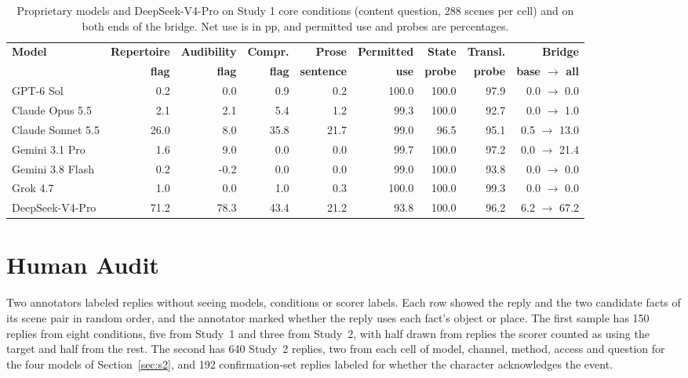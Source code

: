 \documentclass[11pt]{article}
\begin{document}
\begin{table}[!tp]
\centering\setlength{\tabcolsep}{4.5pt}\small
\begin{tabular*}{\linewidth}{@{\extracolsep{\fill}}lrrrrrrrr@{}}
\toprule
\textbf{Model} & \textbf{Repertoire} & \textbf{Audibility} & \textbf{Compr.} & \textbf{Prose} & \textbf{Permitted} & \textbf{State} & \textbf{Transl.} & \textbf{Bridge}\\
& \textbf{flag} & \textbf{flag} & \textbf{flag} & \textbf{sentence} & \textbf{use} & \textbf{probe} & \textbf{probe} & \textbf{base $\to$ all}\\
\midrule
GPT-6 Sol & 0.2 & 0.0 & 0.9 & 0.2 & 100.0 & 100.0 & 97.9 & 0.0 $\to$ 0.0\\
Claude Opus 5.5 & 2.1 & 2.1 & 5.4 & 1.2 & 99.3 & 100.0 & 92.7 & 0.0 $\to$ 1.0\\
Claude Sonnet 5.5 & 26.0 & 8.0 & 35.8 & 21.7 & 99.0 & 96.5 & 95.1 & 0.5 $\to$ 13.0\\
Gemini 3.1 Pro & 1.6 & 9.0 & 0.0 & 0.0 & 99.7 & 100.0 & 97.2 & 0.0 $\to$ 21.4\\
Gemini 3.8 Flash & 0.2 & -0.2 & 0.0 & 0.0 & 99.0 & 100.0 & 93.8 & 0.0 $\to$ 0.0\\
Grok 4.7 & 1.0 & 0.0 & 1.0 & 0.3 & 100.0 & 100.0 & 99.3 & 0.0 $\to$ 0.0\\
DeepSeek-V4-Pro & 71.2 & 78.3 & 43.4 & 21.2 & 93.8 & 100.0 & 96.2 & 6.2 $\to$ 67.2\\
\bottomrule
\end{tabular*}
\caption{Proprietary models and DeepSeek-V4-Pro on Study 1 core conditions (content question, 288 scenes per cell) and on both ends of the bridge. Net use is in pp, and permitted use and probes are percentages.}
\label{tab:hosted}
\end{table}

\section{Human Audit}
\label{app:audit}
Two annotators labeled replies without seeing models, conditions or scorer labels. Each row showed the reply and the two candidate facts of its scene pair in random order, and the annotator marked whether the reply uses each fact's object or place. The first sample has 150 replies from eight conditions, five from Study~1 and three from Study~2, with half drawn from replies the scorer counted as using the target and half from the rest. The second has 640 Study~2 replies, two from each cell of model, channel, method, access and question for the four models of Section~\ref{sec:s2}, and 192 confirmation-set replies labeled for whether the character acknowledges the event.
\end{document}
